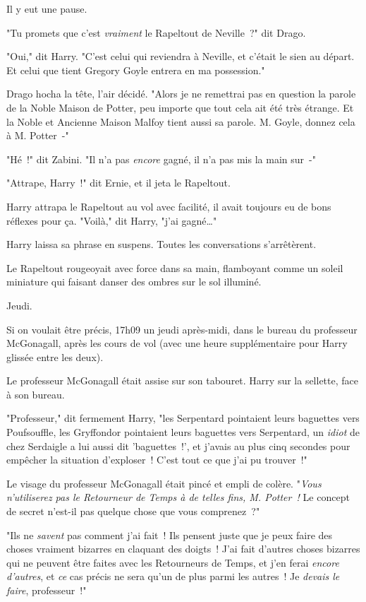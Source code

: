 Il y eut une pause.

"Tu promets que c'est \emph{vraiment} le Rapeltout de Neville~?" dit Drago.

"Oui," dit Harry. "C'est celui qui reviendra à Neville, et c'était le sien au départ. Et celui que tient Gregory Goyle entrera en ma possession."

Drago hocha la tête, l'air décidé. "Alors je ne remettrai pas en question la parole de la Noble Maison de Potter, peu importe que tout cela ait été très étrange. Et la Noble et Ancienne Maison Malfoy tient aussi sa parole. M. Goyle, donnez cela à M. Potter~-"

"Hé~!" dit Zabini. "Il n'a pas \emph{encore} gagné, il n'a pas mis la main sur~-"

"Attrape, Harry~!" dit Ernie, et il jeta le Rapeltout.

Harry attrapa le Rapeltout au vol avec facilité, il avait toujours eu de bons réflexes pour ça. "Voilà," dit Harry, "j'ai gagné…"

Harry laissa sa phrase en suspens. Toutes les conversations s'arrêtèrent.

Le Rapeltout rougeoyait avec force dans sa main, flamboyant comme un soleil miniature qui faisant danser des ombres sur le sol illuminé.

\later

Jeudi.

Si on voulait être précis, 17h09 un jeudi après-midi, dans le bureau du professeur McGonagall, après les cours de vol (avec une heure supplémentaire pour Harry glissée entre les deux).

Le professeur McGonagall était assise sur son tabouret. Harry sur la sellette, face à son bureau.

"Professeur," dit fermement Harry, "les Serpentard pointaient leurs baguettes vers Poufsouffle, les Gryffondor pointaient leurs baguettes vers Serpentard, un \emph{idiot} de chez Serdaigle a lui aussi dit 'baguettes~!', et j'avais au plus cinq secondes pour empêcher la situation d'exploser~! C'est tout ce que j'ai pu trouver~!"

Le visage du professeur McGonagall était pincé et empli de colère. "\emph{Vous n'utiliserez pas le Retourneur de Temps à de telles fins, M. Potter~!} Le concept de secret n'est-il pas quelque chose que vous comprenez~?"

"Ils ne \emph{savent} pas comment j'ai fait~! Ils pensent juste que je peux faire des choses vraiment bizarres en claquant des doigts~! J'ai fait d'autres choses bizarres qui ne peuvent être faites avec les Retourneurs de Temps, et j'en ferai \emph{encore d'autres}, et \emph{ce} cas précis ne sera qu'un de plus parmi les autres~! Je \emph{devais le faire}, professeur~!"

